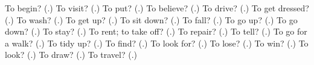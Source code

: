 \begin{tcolorbox}[breakable,colback=teal!4,colframe=teal!35!black,title={Before you move on}]
To begin? (\textbf{}.) To visit? (\textbf{}.) To put? (\textbf{}.) To believe? (\textbf{}.) To drive? (\textbf{}.) To get dressed? (\textbf{}.) To wash? (\textbf{}.) To get up? (\textbf{}.) To sit down? (\textbf{}.) To fall? (\textbf{}.) To go up? (\textbf{}.) To go down? (\textbf{}.) To stay? (\textbf{}.) To rent; to take off? (\textbf{}.) To repair? (\textbf{}.) To tell? (\textbf{}.) To go for a walk? (\textbf{}.) To tidy up? (\textbf{}.) To find? (\textbf{}.) To look for? (\textbf{}.) To lose? (\textbf{}.) To win? (\textbf{}.) To look? (\textbf{}.) To draw? (\textbf{}.) To travel? (\textbf{}.)
\end{tcolorbox}
